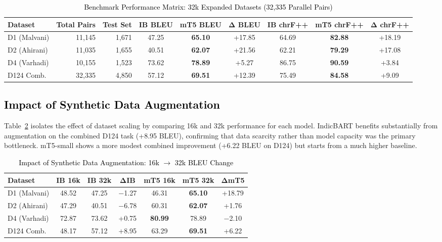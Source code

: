 \begin{table}[t]
\color{black}
\centering
\caption{\textcolor{black}{Benchmark Performance Matrix: 32k Expanded Datasets (32,335 Parallel Pairs)}}
\label{tab:results_32k}
\begin{tabular}{lrrcccccc}
\hline
\textbf{Dataset} & \textbf{Total Pairs} & \textbf{Test Set} & \textbf{IB BLEU} & \textbf{mT5 BLEU} & $\boldsymbol{\Delta}$\textbf{ BLEU} & \textbf{IB chrF++} & \textbf{mT5 chrF++} & $\boldsymbol{\Delta}$\textbf{ chrF++} \\
\hline
D1 (Malvani) & 11,145 & 1,671 & 47.25 & \textbf{65.10} & +17.85 & 64.69 & \textbf{82.88} & +18.19 \\
D2 (Ahirani) & 11,035 & 1,655 & 40.51 & \textbf{62.07} & +21.56 & 62.21 & \textbf{79.29} & +17.08 \\
D4 (Varhadi) & 10,155 & 1,523 & 73.62 & \textbf{78.89} & +5.27 & 86.75 & \textbf{90.59} & +3.84 \\
\hline
D124 Comb. & 32,335 & 4,850 & 57.12 & \textbf{69.51} & +12.39 & 75.49 & \textbf{84.58} & +9.09 \\
\hline
\end{tabular}
\end{table}

\subsection{\textcolor{black}{Impact of Synthetic Data Augmentation}}

Table~\ref{tab:augmentation_impact} isolates the effect of dataset scaling by comparing 16k and 32k performance for each model. IndicBART benefits substantially from augmentation on the combined D124 task (+8.95 BLEU), confirming that data scarcity rather than model capacity was the primary bottleneck. mT5-small shows a more modest combined improvement (+6.22 BLEU on D124) but starts from a much higher baseline.

\begin{table}[t]
\color{black}
\centering
\caption{\textcolor{black}{Impact of Synthetic Data Augmentation: 16k $\rightarrow$ 32k BLEU Change}}
\label{tab:augmentation_impact}
\begin{tabular}{lcccccc}
\hline
\textbf{Dataset} & \textbf{IB 16k} & \textbf{IB 32k} & $\boldsymbol{\Delta}$\textbf{IB} & \textbf{mT5 16k} & \textbf{mT5 32k} & $\boldsymbol{\Delta}$\textbf{mT5} \\
\hline
D1 (Malvani) & 48.52 & 47.25 & $-$1.27 & 46.31 & \textbf{65.10} & +18.79 \\
D2 (Ahirani) & 47.29 & 40.51 & $-$6.78 & 60.31 & \textbf{62.07} & +1.76 \\
D4 (Varhadi) & 72.87 & 73.62 & +0.75 & \textbf{80.99} & 78.89 & $-$2.10 \\
\hline
D124 Comb. & 48.17 & 57.12 & +8.95 & 63.29 & \textbf{69.51} & +6.22 \\
\hline
\end{tabular}
\end{table}

